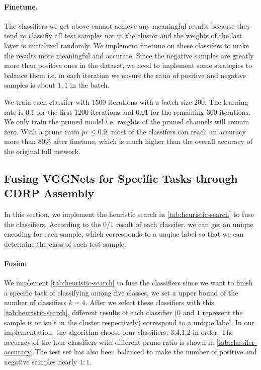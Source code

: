 \documentclass[sigplan,10pt,review]{acmart}\settopmatter{printfolios=true,printccs=false,printacmref=false}
\begin{document}
\paragraph{Finetune.} The classifiers we get above cannot achieve any meaningful results because they tend to classifiy all test samples not in the cluster and the weights of the last layer is initialized randomly.
We implement finetune on these classifers to make the results more meaningful and accurate. 
Since the negative samples are greatly more than positive ones in the dataset, we need to implement some strategies to balance them i.e. in each iteration we ensure the ratio of positive and negative samples is about $1:1$ in the batch.

We train each classifer with $1500$ iterations with a batch size $200$. 
The learning rate is $0.1$ for the first $1200$ iterations and $0.01$ for the remaining $300$ iterations. 
We only train the pruned model i.e. weights of the pruned channels will remain zero.
With a prune ratio $pr\leq0.9$, most of the classifers can reach an accuracy more than 80\% after finetune, which is much higher than the overall accuracy of the original full network.
 

 
\subsection{Fusing VGGNets for Specific Tasks through CDRP Assembly}
In this section, we implement the heuristic search in \cref{tab:heuristic-search} to fuse the classifiers. According to the 0/1 result of each classifer, we can get an unique encoding for each sample, which corresponds to a unqiue label so that we can determine the class of each test sample.

\paragraph{Fusion}We implement \cref{tab:heuristic-search} to fuse the classifiers since we want to finish a specific task of classifying among five classes, we set a upper bound of the number of classifiers $k=4$. 
After we select these classifiers with this \cref{tab:heuristic-search}, different results of each classifier ($0$ and $1$ represent the sample is or isn't in the cluster respectively) correspond to a unique label.
In our implementation, the algorithm choose four classifiers: 3,4,1,2 in order. 
The accuracy of the four classifiers with different prune ratio is shown in \cref{tab:classifer-accuracy}.The test set has also been balanced to make the number of positive and negative samples nearly $1:1$. 
\end{document}
